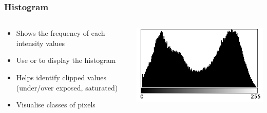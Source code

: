 \documentclass[ignorenonframetext,aspectratio=169,10pt,xcolor=table]{beamer}
\begin{document}
\begin{frame}
  \frametitle{Histogram}
  \begin{columns}
    \begin{column}{0.5\textwidth}
      \begin{itemize}
      \item Shows the frequency of each intensity values
      \item Use  or  to display the
        histogram
      \item Helps identify clipped values (under/over exposed, saturated)
      \item Visualise classes of pixels
      \end{itemize}
    \end{column}
    \begin{column}{0.5\textwidth}
      \includegraphics[width=\textwidth]{histogram}
    \end{column}
  \end{columns}
\end{frame}
\end{document}
